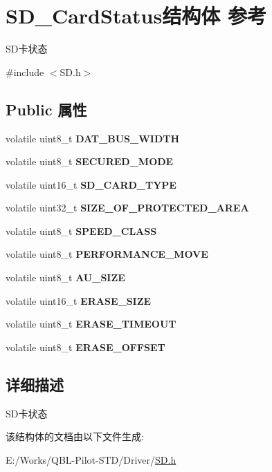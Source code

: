\hypertarget{struct_s_d___card_status}{}\section{S\+D\+\_\+\+Card\+Status结构体 参考}
\label{struct_s_d___card_status}


S\+D卡状态  




{\ttfamily \#include $<$S\+D.\+h$>$}

\subsection*{Public 属性}
\begin{DoxyCompactItemize}
\item 
volatile uint8\+\_\+t {\bfseries D\+A\+T\+\_\+\+B\+U\+S\+\_\+\+W\+I\+D\+TH}
\item 
volatile uint8\+\_\+t {\bfseries S\+E\+C\+U\+R\+E\+D\+\_\+\+M\+O\+DE}
\item 
volatile uint16\+\_\+t {\bfseries S\+D\+\_\+\+C\+A\+R\+D\+\_\+\+T\+Y\+PE}
\item 
volatile uint32\+\_\+t {\bfseries S\+I\+Z\+E\+\_\+\+O\+F\+\_\+\+P\+R\+O\+T\+E\+C\+T\+E\+D\+\_\+\+A\+R\+EA}
\item 
volatile uint8\+\_\+t {\bfseries S\+P\+E\+E\+D\+\_\+\+C\+L\+A\+SS}
\item 
volatile uint8\+\_\+t {\bfseries P\+E\+R\+F\+O\+R\+M\+A\+N\+C\+E\+\_\+\+M\+O\+VE}
\item 
volatile uint8\+\_\+t {\bfseries A\+U\+\_\+\+S\+I\+ZE}
\item 
volatile uint16\+\_\+t {\bfseries E\+R\+A\+S\+E\+\_\+\+S\+I\+ZE}
\item 
volatile uint8\+\_\+t {\bfseries E\+R\+A\+S\+E\+\_\+\+T\+I\+M\+E\+O\+UT}
\item 
volatile uint8\+\_\+t {\bfseries E\+R\+A\+S\+E\+\_\+\+O\+F\+F\+S\+ET}
\end{DoxyCompactItemize}


\subsection{详细描述}
S\+D卡状态 

该结构体的文档由以下文件生成\+:\begin{DoxyCompactItemize}
\item 
E\+:/\+Works/\+Q\+B\+L-\/\+Pilot-\/\+S\+T\+D/\+Driver/\hyperlink{_s_d_8h}{S\+D.\+h}\end{DoxyCompactItemize}

